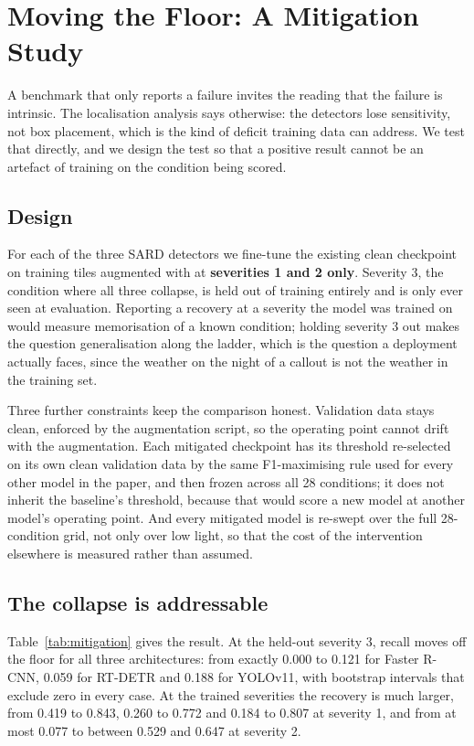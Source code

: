 \section{Moving the Floor: A Mitigation Study}
\label{sec:mitigation}

A benchmark that only reports a failure invites the reading that the
failure is intrinsic. The localisation analysis says otherwise: the
detectors lose sensitivity, not box placement, which is the kind of
deficit training data can address. We test that directly, and we design
the test so that a positive result cannot be an artefact of training on
the condition being scored.

\subsection{Design}

For each of the three SARD detectors we fine-tune the existing clean
checkpoint on training tiles augmented with  at
\textbf{severities 1 and 2 only}. Severity 3, the condition where all
three collapse, is held out of training entirely and is only ever seen
at evaluation. Reporting a recovery at a severity the model was trained
on would measure memorisation of a known condition; holding severity 3
out makes the question generalisation along the ladder, which is the
question a deployment actually faces, since the weather on the night of
a callout is not the weather in the training set.

Three further constraints keep the comparison honest. Validation data
stays clean, enforced by the augmentation script, so the operating point
cannot drift with the augmentation. Each mitigated checkpoint has its
threshold re-selected on its own clean validation data by the same
F1-maximising rule used for every other model in the paper, and then
frozen across all 28 conditions; it does not inherit the baseline's
threshold, because that would score a new model at another model's
operating point. And every mitigated model is re-swept over the full
28-condition grid, not only over low light, so that the cost of the
intervention elsewhere is measured rather than assumed.

\subsection{The collapse is addressable}

Table~\ref{tab:mitigation} gives the result. At the held-out severity 3,
recall moves off the floor for all three architectures: from exactly
0.000 to 0.121 for Faster R-CNN, 0.059 for RT-DETR and 0.188 for
YOLOv11, with bootstrap intervals that exclude zero in every case. At
the trained severities the recovery is much larger, from 0.419 to 0.843,
0.260 to 0.772 and 0.184 to 0.807 at severity 1, and from at most 0.077
to between 0.529 and 0.647 at severity 2.

